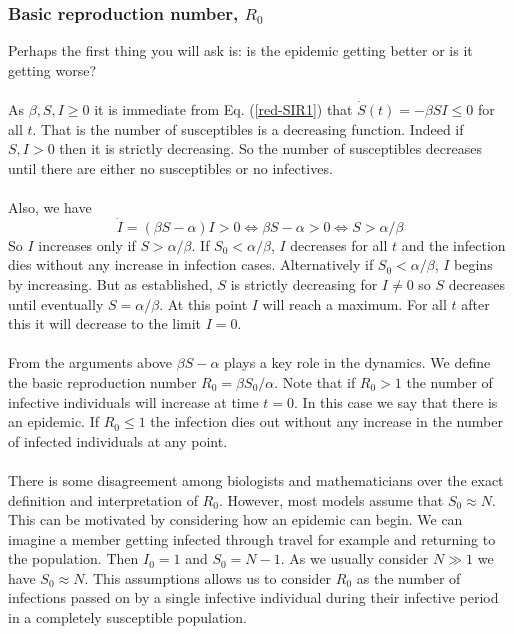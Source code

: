 \subsubsection{Basic reproduction number, $R_0$}
Perhaps the first thing you will ask is: is the epidemic getting better or is it getting worse?\\
\\
As $\beta,S,I\geq 0$ it is immediate from Eq. (\ref{red-SIR1}) that $\dot S(t)=-\beta SI\leq 0$ for all $t$. That is the number of susceptibles is a decreasing function. Indeed if $S,I>0$ then it is strictly decreasing. So the number of susceptibles decreases until there are either no susceptibles or no infectives.\\
\\
Also, we have \[\dot I=(\beta S-\alpha)I>0\iff\beta S-\alpha>0\iff S>\alpha/\beta\] So $I$ increases only if $S>\alpha/\beta$. If $S_0<\alpha/\beta$, $I$ decreases for all $t$ and the infection dies without any increase in infection cases. Alternatively if $S_0<\alpha/\beta$, $I$ begins by increasing. But as established, $S$ is strictly decreasing for $I\neq0$ so $S$ decreases until eventually $S=\alpha/\beta$. At this point $I$ will reach a maximum. For all $t$ after this it will decrease to the limit $I=0$.\\
\\
From the arguments above $\beta S-\alpha$ plays a key role in the dynamics. We define the basic reproduction number $R_0=\beta S_0/\alpha$\cite{models-epidemiology-2}. Note that if $R_0>1$ the number of infective individuals will increase at time $t=0$. In this case we say that there is an epidemic. If $R_0\leq1$ the infection dies out without any increase in the number of infected individuals at any point.\\
\\
There is some disagreement among biologists and mathematicians over the exact definition and interpretation of $R_0$\cite{Heffernan281}. However, most models assume that $S_0\approx N$. This can be motivated by considering how an epidemic can begin. We can imagine a member getting infected through travel for example and returning to the population. Then $I_0=1$ and $S_0=N-1$. As we usually consider $N\gg1$ we have $S_0\approx N$. This assumptions allows us to consider $R_0$ as the number of infections passed on by a single infective individual during their infective period in a completely susceptible population.\label{mm}\\
\\
